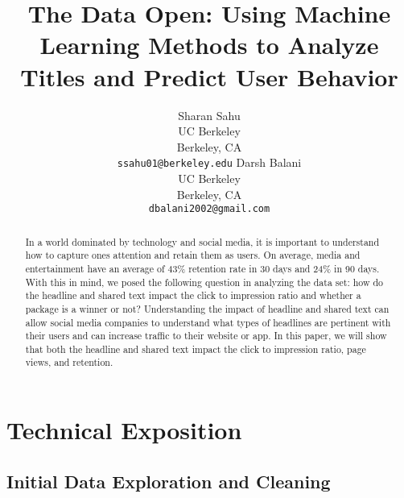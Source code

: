 \documentclass{article}
\title{The Data Open: Using Machine Learning Methods to Analyze Titles and Predict User Behavior}
\author{
  Sharan Sahu\\
  UC Berkeley\\
  Berkeley, CA\\
  \texttt{ssahu01@berkeley.edu}
   \And
 Darsh Balani \\
  UC Berkeley\\
  Berkeley, CA\\
  \texttt{dbalani2002@gmail.com}
}
\begin{document}
\maketitle

\begin{abstract}
In a world dominated by technology and social media, it is important to understand how to capture ones attention and retain them as users. On average, media and entertainment have an average of 43\% retention rate in 30 days and 24\% in 90 days. With this in mind, we posed the following question in analyzing the data set: how do the headline and shared text impact the click to impression ratio and whether a package is a winner or not? Understanding the impact of headline and shared text can allow social media companies to understand what types of headlines are pertinent with their users and can increase traffic to their website or app. In this paper, we will show that both the headline and shared text impact the click to impression ratio,  page views,  and retention.
\end{abstract}

\section{Technical Exposition}

\subsection{Initial Data Exploration and Cleaning}
\end{document}
